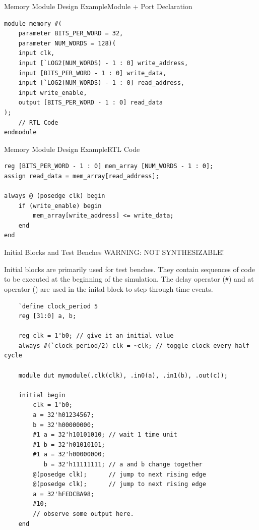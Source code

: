 \documentclass{beamer}
\begin{document}
\begin{frame}[fragile]{Memory Module Design Example}{Module + Port Declaration}
\begin{verbatim}
module memory #(
	parameter BITS_PER_WORD = 32, 
	parameter NUM_WORDS = 128)(
	input clk,
	input [`LOG2(NUM_WORDS) - 1 : 0] write_address,
	input [BITS_PER_WORD - 1 : 0] write_data,
	input [`LOG2(NUM_WORDS) - 1 : 0] read_address,
	input write_enable,
	output [BITS_PER_WORD - 1 : 0] read_data
);
	// RTL Code
endmodule
\end{verbatim}
\end{frame}

\begin{frame}[fragile]{Memory Module Design Example}{RTL Code}
\begin{verbatim}
reg [BITS_PER_WORD - 1 : 0] mem_array [NUM_WORDS - 1 : 0];
assign read_data = mem_array[read_address];

always @ (posedge clk) begin
	if (write_enable) begin
		mem_array[write_address] <= write_data;
	end
end
\end{verbatim}
\end{frame}

\begin{frame}[fragile]{Initial Blocks and Test Benches}
	WARNING: NOT SYNTHESIZABLE!

	Initial blocks are primarily used for test benches.
	They contain sequences of code to be executed at the beginning of the simulation.
	The delay operator (\texttt{\#}) and at operator (\texttt{\@{}}) are used in the inital block to step through time events.

	\begin{verbatim}
	`define clock_period 5
	reg [31:0] a, b;

	reg clk = 1'b0; // give it an initial value
	always #(`clock_period/2) clk = ~clk; // toggle clock every half cycle

	module dut mymodule(.clk(clk), .in0(a), .in1(b), .out(c));

	initial begin
		clk = 1'b0;
		a = 32'h01234567;
		b = 32'h00000000;
		#1 a = 32'h10101010; // wait 1 time unit
		#1 b = 32'h01010101;
		#1 a = 32'h00000000;
		   b = 32'h11111111; // a and b change together
		@(posedge clk);      // jump to next rising edge
		@(posedge clk);      // jump to next rising edge
		a = 32'hFEDCBA98;
		#10;
		// observe some output here.
	end
	\end{verbatim}

\end{frame}
\end{document}
